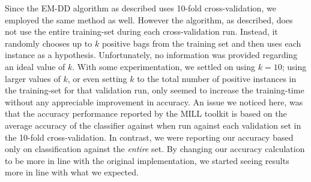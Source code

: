 \documentclass[conference]{IEEEtran}
\begin{document}
Since the EM-DD algorithm as described uses 10-fold cross-validation, we employed the same method as well. However the algorithm, as described, does not use the entire training-set during each cross-validation run. Instead, it randomly chooses up to $k$ positive bags from the training set and then uses each instance as a hypothesis. Unfortunately, no information was provided regarding an ideal value of $k$. With some experimentation, we settled on using $k = 10$; using larger values of $k$, or even setting $k$ to the total number of positive instances in the training-set for that validation run, only seemed to increase the training-time without any appreciable improvement in accuracy. An issue we noticed here, was that the accuracy performance reported by the MILL toolkit is based on the average accuracy of the classifier against when run against each validation set in the 10-fold cross-validation. In contrast, we were reporting our accuracy based only on classification against the \textit{entire} set. By changing our accuracy calculation to be more in line with the original implementation, we started seeing results more in line with what we expected.
\end{document}
